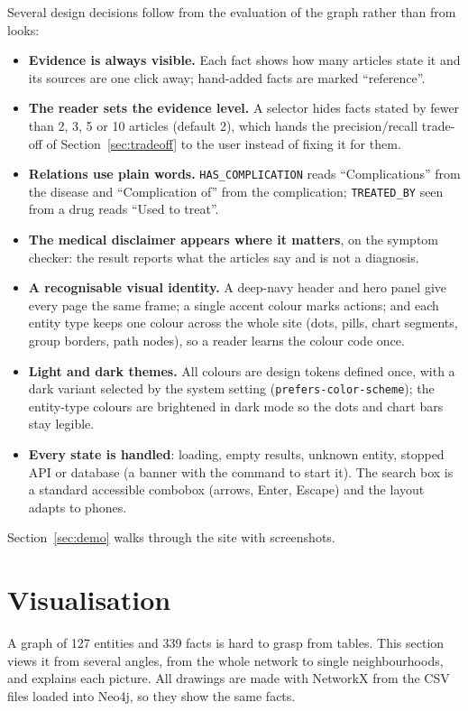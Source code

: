 \documentclass[11pt, a4paper]{article}
\newcommand{\code}[1]{\texttt{#1}}
\begin{document}
Several design decisions follow from the evaluation of the graph rather than from looks:
\begin{itemize}
    \item \textbf{Evidence is always visible.} Each fact shows how many articles state it and its sources are one click away; hand-added facts are marked ``reference''.
    \item \textbf{The reader sets the evidence level.} A selector hides facts stated by fewer than 2, 3, 5 or 10 articles (default 2), which hands the precision/recall trade-off of Section~\ref{sec:tradeoff} to the user instead of fixing it for them.
    \item \textbf{Relations use plain words.} \code{HAS\_COMPLICATION} reads ``Complications'' from the disease and ``Complication of'' from the complication; \code{TREATED\_BY} seen from a drug reads ``Used to treat''.
    \item \textbf{The medical disclaimer appears where it matters}, on the symptom checker: the result reports what the articles say and is not a diagnosis.
    \item \textbf{A recognisable visual identity.} A deep-navy header and hero panel give every page the same frame; a single accent colour marks actions; and each entity type keeps one colour across the whole site (dots, pills, chart segments, group borders, path nodes), so a reader learns the colour code once.
    \item \textbf{Light and dark themes.} All colours are design tokens defined once, with a dark variant selected by the system setting (\code{prefers-color-scheme}); the entity-type colours are brightened in dark mode so the dots and chart bars stay legible.
    \item \textbf{Every state is handled}: loading, empty results, unknown entity, stopped API or database (a banner with the command to start it). The search box is a standard accessible combobox (arrows, Enter, Escape) and the layout adapts to phones.
\end{itemize}
Section~\ref{sec:demo} walks through the site with screenshots.

\section{Visualisation}
\label{sec:visualisation}

A graph of 127 entities and 339 facts is hard to grasp from tables. This section views it from several angles, from the whole network to single neighbourhoods, and explains each picture. All drawings are made with NetworkX from the CSV files loaded into Neo4j, so they show the same facts.
\end{document}
